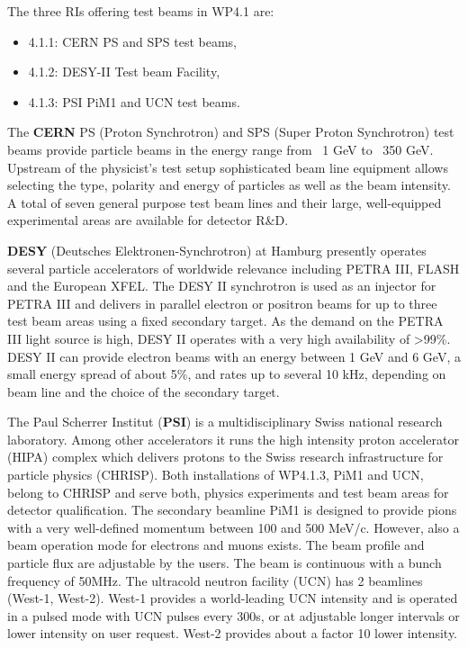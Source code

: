 The three RIs offering test beams in WP4.1 are:
\begin{itemize}
    \item 4.1.1: CERN PS and SPS test beams,
    \item 4.1.2: DESY-II Test beam Facility,
    \item 4.1.3: PSI PiM1 and UCN test beams.
\end{itemize}

The \textbf{CERN} PS (Proton Synchrotron) and SPS (Super Proton Synchrotron) test beams provide particle beams in the energy range from ~1 GeV to ~350 GeV. Upstream of the physicist’s test setup sophisticated beam line equipment allows selecting the type, polarity and energy of particles as well as the beam intensity. A total of seven general purpose test beam lines and their large, well-equipped experimental areas are available for detector R\&D.

\textbf{DESY} (Deutsches Elektronen-Synchrotron) at Hamburg presently operates several particle accelerators of worldwide relevance including PETRA III, FLASH and the European XFEL. The DESY II synchrotron is used as an injector for PETRA III and delivers in parallel electron or positron beams for up to three test beam areas using a fixed secondary target. As the demand on the PETRA III light source is high, DESY II operates with a very high availability of >99\%. DESY II can provide electron beams with an energy between 1 GeV and 6 GeV, a small energy spread of about 5\%, and rates up to several 10 kHz, depending on beam line and the choice of the secondary target. 

The Paul Scherrer Institut (\textbf{PSI}) is a multidisciplinary Swiss national research laboratory. Among other accelerators it runs the high intensity proton accelerator (HIPA) complex which delivers protons to the Swiss research infrastructure for particle physics (CHRISP). Both installations of WP4.1.3, PiM1 and UCN, belong to CHRISP and serve both, physics experiments and test beam areas for detector qualification. The secondary beamline PiM1 is designed to provide pions with a very well-defined momentum between 100 and 500 MeV/c. However, also a beam operation mode for electrons and muons exists. The beam profile and particle flux are adjustable by the users. The beam is continuous with a bunch frequency of 50MHz. The ultracold neutron facility (UCN) has 2 beamlines (West-1, West-2). West-1 provides a world-leading UCN intensity and is operated in a pulsed mode with UCN pulses every 300s, or at adjustable longer intervals or lower intensity on user request. West-2 provides about a factor 10 lower intensity. 

